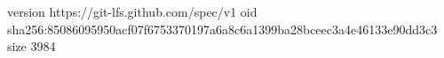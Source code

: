 version https://git-lfs.github.com/spec/v1
oid sha256:85086095950acf07f6753370197a6a8c6a1399ba28bceec3a4e46133e90dd3c3
size 3984
